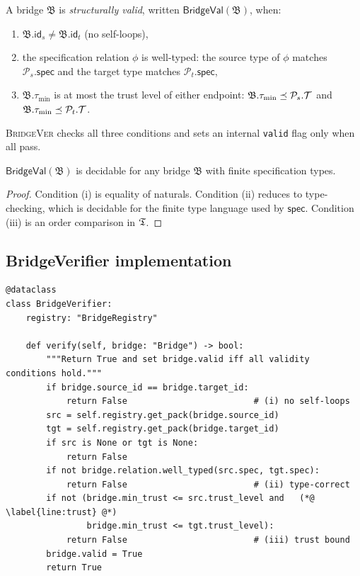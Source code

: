 \documentclass[11pt]{article}
\newcommand{\Pack}{\mathcal{P}}
\newcommand{\Brid}{\mathfrak{B}}
\newcommand{\PackId}{\mathsf{id}}
\newcommand{\PackSpec}{\mathsf{spec}}
\newcommand{\BridgeVal}{\ensuremath{\mathsf{BridgeVal}}}
\newcommand{\BVer}{\textsc{BridgeVer}}
\begin{document}
\begin{definition}
\label{def:bridge-val}
A bridge $\Brid$ is \emph{structurally valid}, written
$\BridgeVal(\Brid)$, when:
\begin{enumerate}[label=(\roman*)]
  \item $\Brid.\PackId_s \neq \Brid.\PackId_t$ (no self-loops),
  \item the specification relation $\phi$ is well-typed: the source
    type of $\phi$ matches $\Pack_s.\PackSpec$ and the target type
    matches $\Pack_t.\PackSpec$,
  \item $\Brid.\tau_{\min}$ is at most the trust level of either
    endpoint: $\Brid.\tau_{\min} \tleq \Pack_s.\trust$ and
    $\Brid.\tau_{\min} \tleq \Pack_t.\trust$.
\end{enumerate}
\end{definition}

\BVer{} checks all three conditions and sets an internal
\texttt{valid} flag only when all pass.

\begin{proposition}
\label{prop:decidable}
$\BridgeVal(\Brid)$ is decidable for any bridge $\Brid$ with
finite specification types.
\end{proposition}
\begin{proof}
Condition (i) is equality of naturals.  Condition (ii) reduces to
type-checking, which is decidable for the finite type language used
by $\PackSpec$.  Condition (iii) is an order comparison in $\mathfrak{T}$.
\end{proof}

\subsection{BridgeVerifier implementation}

\begin{lstlisting}[style=jugeo-python, caption={\BVer{} consistency check.}]
@dataclass
class BridgeVerifier:
    registry: "BridgeRegistry"

    def verify(self, bridge: "Bridge") -> bool:
        """Return True and set bridge.valid iff all validity conditions hold."""
        if bridge.source_id == bridge.target_id:
            return False                         # (i) no self-loops
        src = self.registry.get_pack(bridge.source_id)
        tgt = self.registry.get_pack(bridge.target_id)
        if src is None or tgt is None:
            return False
        if not bridge.relation.well_typed(src.spec, tgt.spec):
            return False                         # (ii) type-correct
        if not (bridge.min_trust <= src.trust_level and   (*@ \label{line:trust} @*)
                bridge.min_trust <= tgt.trust_level):
            return False                         # (iii) trust bound
        bridge.valid = True
        return True
\end{lstlisting}
\end{document}
